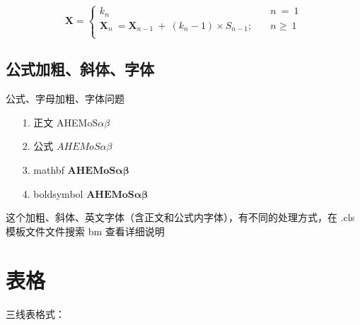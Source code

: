 \documentclass[AutoFakeBold]{LZUThesis-PgD&PhD}
\begin{document}
\begin{equation}\label{eq:multi}
  \mathbf{X}=
    \begin{cases}
      k_n \quad & n \ = \ 1 \\
      \mathbf{X}_n \ = \mathbf{X}_{n-1}\ +\ (k_n-1)\times S_{n-1};
      \quad & n \geq \ 1\\
    \end{cases}
\end{equation}

\subsection{公式加粗、斜体、字体}

公式、字母加粗、字体问题

\begin{itemize}
  \item [1. 正文] AHEMoS$\alpha \beta$
  \item[2. 公式]  $AHEMoS \alpha \beta$
  \item[3. mathbf] $\mathbf{AHEMoS\alpha \beta}$
  \item [4. boldsymbol] $\boldsymbol{AHEMoS\alpha \beta}$
\end{itemize}

这个加粗、斜体、英文字体（含正文和公式内字体），有不同的处理方式，在 .cls 模板文件文件搜索 bm 查看详细说明



\section{表格}

三线表格式：

\end{document}
